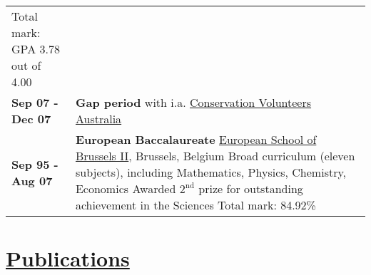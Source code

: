 \documentclass[a4paper,8pt]{extarticle}
\begin{document}
\begin{center}
\begin{tabular}{p{}p{}}
Total mark: GPA 3.78 out of 4.00
\vspace{2mm}\\
\textbf{Sep 07 - Dec 07}&\textbf{Gap period} with i.a. \href{http://conservationvolunteers.com.au}{Conservation Volunteers Australia}
\vspace{2mm}\\
\textbf{Sep 95 - Aug 07}&\textbf{European Baccalaureate}\newline
\href{http://www.eeb2.be/site/}{European School of Brussels II}, Brussels, Belgium\newline
Broad curriculum (eleven subjects), including Mathematics, Physics, Chemistry, Economics\newline
Awarded $2^\text{nd}$ prize for outstanding achievement in the Sciences\newline
Total mark: 84.92\%
\end{tabular}
\end{center}

\vspace{-1mm}

\section*{\href{http://www.lbogaardt.eu}{Publications}}

\enlargethispage{20mm}
\end{document}
